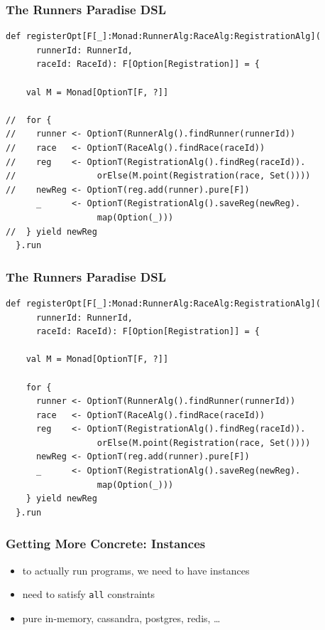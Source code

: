 \documentclass{beamer}
\begin{document}
\begin{frame}[fragile]
  \addtocounter{framenumber}{-1}
  \frametitle{The Runners Paradise DSL}
\begin{verbatim}
def registerOpt[F[_]:Monad:RunnerAlg:RaceAlg:RegistrationAlg](
      runnerId: RunnerId,
      raceId: RaceId): F[Option[Registration]] = {

    val M = Monad[OptionT[F, ?]]

//  for {
//    runner <- OptionT(RunnerAlg().findRunner(runnerId))
//    race   <- OptionT(RaceAlg().findRace(raceId))
//    reg    <- OptionT(RegistrationAlg().findReg(raceId)).
//                orElse(M.point(Registration(race, Set())))
//    newReg <- OptionT(reg.add(runner).pure[F])
      _      <- OptionT(RegistrationAlg().saveReg(newReg).
                  map(Option(_)))
//  } yield newReg
  }.run
\end{verbatim}
\end{frame}

\begin{frame}[fragile]
  \addtocounter{framenumber}{-1}
  \frametitle{The Runners Paradise DSL}
\begin{verbatim}
def registerOpt[F[_]:Monad:RunnerAlg:RaceAlg:RegistrationAlg](
      runnerId: RunnerId,
      raceId: RaceId): F[Option[Registration]] = {

    val M = Monad[OptionT[F, ?]]

    for {
      runner <- OptionT(RunnerAlg().findRunner(runnerId))
      race   <- OptionT(RaceAlg().findRace(raceId))
      reg    <- OptionT(RegistrationAlg().findReg(raceId)).
                  orElse(M.point(Registration(race, Set())))
      newReg <- OptionT(reg.add(runner).pure[F])
      _      <- OptionT(RegistrationAlg().saveReg(newReg).
                  map(Option(_)))
    } yield newReg
  }.run
\end{verbatim}
\end{frame}

\begin{frame}
  \frametitle{Getting More Concrete: Instances}
  \begin{itemize}
  \item to actually run programs, we need to have instances
  \item need to satisfy \texttt{all} constraints
  \item pure in-memory, cassandra, postgres, redis, \dots{}
  \end{itemize}
\end{frame}
\end{document}
